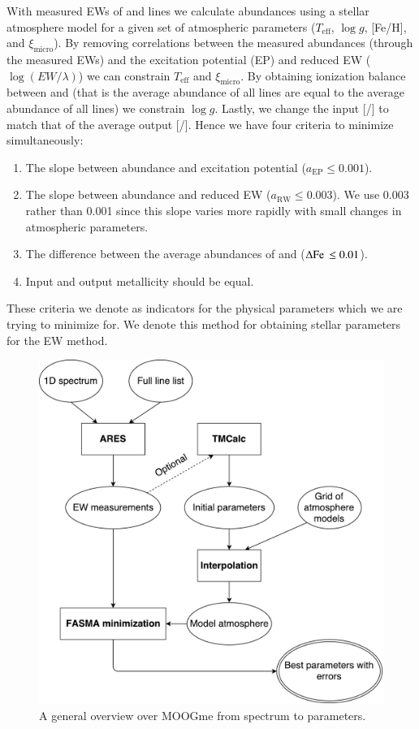 \documentclass{aa}
\begin{document}
With measured EWs of  and  lines we calculate abundances
using a stellar atmosphere model for a given set of atmospheric parameters
($T_\mathrm{eff}$, $\log g$, [Fe/H], and $\xi_\mathrm{micro}$). By removing
correlations between the measured abundances (through the measured EWs) and the
excitation potential (EP) and reduced EW ($\log(EW/\lambda)$) we can constrain
$T_\mathrm{eff}$ and $\xi_\mathrm{micro}$. By obtaining ionization balance
between  and  (that is the average abundance of all
 lines are equal to the average abundance of all  lines)
we constrain $\log g$. Lastly, we change the input [/] to match
that of the average output [/]. Hence we have four criteria to
minimize simultaneously:

\begin{enumerate}
    \item The slope between abundance and excitation potential ($a_\mathrm{EP}\le0.001$).
    \item The slope between abundance and reduced EW ($a_\mathrm{RW}\le0.003$).
          We use 0.003 rather than 0.001 since this slope varies more rapidly
          with small changes in atmospheric parameters.
    \item The difference between the average abundances of  and
           ($\Delta\ion{Fe}{}\le0.01$).
    \item Input and output metallicity should be equal.
\end{enumerate}
These criteria we denote as indicators for the physical parameters which we are
trying to minimize for. We denote this method for obtaining stellar parameters
for the EW method.

\begin{figure}[tpb]
    \centering
    \includegraphics[width=1.0\linewidth]{figures/MOOGme_general.pdf}
    \caption{A general overview over MOOGme from spectrum to parameters.}
    \label{fig:MOOGme_general}
\end{figure}
\end{document}
